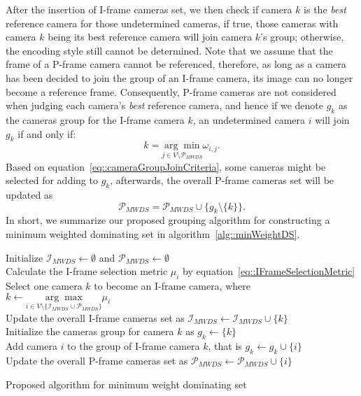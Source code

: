 After the insertion of I-frame cameras set, we then check if camera $k$ is the \emph{best} reference camera for those undetermined cameras, if true, those cameras with camera $k$ being its best reference camera will join camera $k$'s group; otherwise, the encoding style still cannot be determined.
Note that we assume that the frame of a P-frame camera cannot be referenced, therefore, as long as a camera has been decided to join the group of an I-frame camera, its image can no longer become a reference frame.
Consequently, P-frame cameras are not considered when judging each camera's \emph{best} reference camera, and hence if we denote $g_k$ as the cameras group for the I-frame camera $k$, an undetermined camera $i$ will join $g_k$ if and only if:
\begin{equation}
k = \underset{j \in V \setminus \mathcal{P}_{MWDS}}{\arg \min} \omega_{i,j}.
\label{eq::cameraGroupJoinCriteria}
\end{equation}
Based on equation~\eqref{eq::cameraGroupJoinCriteria}, some cameras might be selected for adding to $g_k$, afterwards, the overall P-frame cameras set will be updated as
\begin{equation}
\mathcal{P}_{MWDS} = \mathcal{P}_{MWDS} \cup \{ g_k \setminus \{k\} \}.
\label{eq::updatePCamsSet}
\end{equation}
In short, we summarize our proposed grouping algorithm for constructing a minimum weighted dominating set in algorithm~\ref{alg::minWeightDS}.
%
\IncMargin{1em}
\begin{algorithm}[]
 \SetAlgoLined
 \BlankLine
 Initialize $\mathcal{I}_{MWDS} \gets \emptyset$ and $\mathcal{P}_{MWDS} \gets \emptyset$ \\
 {
 	{
 		Calculate the I-frame selection metric $\mu_i$ by equation~\eqref{eq::IFrameSelectionMetric} \\
 	}
 	Select one camera $k$ to become an I-frame camera, where $k \gets \underset{i \in V \setminus \{ \mathcal{I}_{MWDS} \cup \mathcal{P}_{MWDS} \} }{\arg \max} \mu_i$ \\
 	Update the overall I-frame cameras set as $\mathcal{I}_{MWDS} \gets \mathcal{I}_{MWDS} \cup \{ k \}$ \\
 	Initialize the cameras group for camera $k$ as $g_k \gets \{ k \}$ \\
 	{
 		{
 			Add camera $i$ to the group of I-frame camera $k$, that is $g_k \gets g_k \cup \{ i \}$ \\
 			Update the overall P-frame cameras set as $\mathcal{P}_{MWDS} \gets \mathcal{P}_{MWDS} \cup \{ i \}$ \\
 		}
 	}
 }
 \caption{\label{alg::minWeightDS}Proposed algorithm for minimum weight dominating set}
\end{algorithm}
